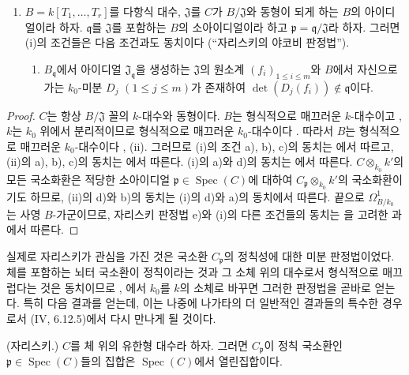 \begin{proposition}[22.6.7]
\begin{enumerate}
  \item[\rm(iii)] $B=k[T_1,\ldots,T_r]$를 다항식 대수,
  $\mathfrak J$를 $C$가 $B/\mathfrak J$와 동형이 되게 하는 $B$의
  아이디얼이라 하자. $\mathfrak q$를 $\mathfrak J$를 포함하는
  $B$의 소아이디얼이라 하고 $\mathfrak p=\mathfrak q/\mathfrak J$라
  하자. 그러면 (i)의 조건들은 다음 조건과도 동치이다
  (“자리스키의 야코비 판정법”).
  \begin{enumerate}
    \item[e)] $B_{\mathfrak q}$에서 아이디얼
    $\mathfrak J_{\mathfrak q}$을 생성하는 $\mathfrak J$의 원소계
    $(f_i)_{1\leq i\leq m}$와 $B$에서 자신으로 가는 $k_0$-미분
    $D_j$ $(1\leq j\leq m)$가 존재하여
    $\det(D_j(f_i))\notin\mathfrak q$이다.
  \end{enumerate}
\end{enumerate}
\end{proposition}

\begin{proof}
$C$는 항상 $B/\mathfrak J$ 꼴의 $k$-대수와 동형이다. $B$는
형식적으로 매끄러운 $k$-대수이고 , $k$는
$k_0$ 위에서 분리적이므로 형식적으로 매끄러운 $k_0$-대수이다
. 따라서 $B$는 형식적으로 매끄러운
$k_0$-대수이다 , (ii). 그러므로 (i)의 조건 a),
b), c)의 동치는 에서 따르고, (ii)의 a), b), c)의
동치는 에서 따른다. (i)의 a)와 d)의 동치는
에서 따른다. $C\otimes_{k_0}k'$의 모든 국소화환은
적당한 소아이디얼 $\mathfrak p\in\operatorname{Spec}(C)$에 대하여
$C_{\mathfrak p}\otimes_{k_0}k'$의 국소화환이기도 하므로, (ii)의
d)와 b)의 동치는 (i)의 d)와 a)의 동치에서 따른다. 끝으로
$\Omega^1_{B/k_0}$는 사영 $B$-가군이므로, 자리스키 판정법 e)와
(i)의 다른 조건들의 동치는 을 고려한
과 에서 따른다.
\end{proof}

실제로 자리스키가 관심을 가진 것은 국소환 $C_{\mathfrak p}$의
정칙성에 대한 미분 판정법이었다. 체를 포함하는 뇌터 국소환이
정칙이라는 것과 그 소체 위의 대수로서 형식적으로 매끄럽다는 것은
동치이므로 , 에서 $k_0$를
$k$의 소체로 바꾸면 그러한 판정법을 곧바로 얻는다. 특히 다음 결과를
얻는데, 이는 나중에 나가타의 더 일반적인 결과들의 특수한 경우로서
(IV, 6.12.5)에서 다시 만나게 될 것이다.

\begin{corollary}[22.6.8]
\label{0.22.6.8-ko}
\textnormal{(자리스키.)}
$C$를 체 위의 유한형 대수라 하자. 그러면
$C_{\mathfrak p}$이 정칙 국소환인
$\mathfrak p\in\operatorname{Spec}(C)$들의 집합은
$\operatorname{Spec}(C)$에서 열린집합이다.
\end{corollary}

